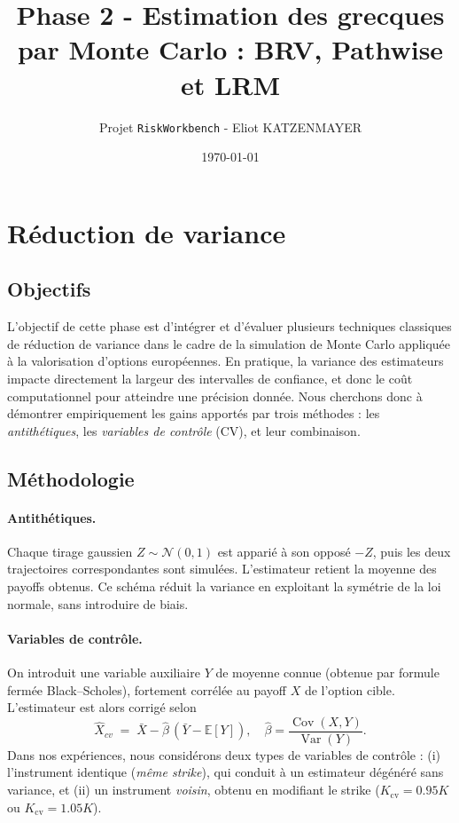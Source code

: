 \documentclass[a4paper,11pt]{article}
\title{Phase 2 - Estimation des grecques par Monte Carlo : BRV, Pathwise et LRM}
\author{Projet \texttt{RiskWorkbench} - Eliot KATZENMAYER}
\date{\today}
\begin{document}
\maketitle

\section{Réduction de variance}

\subsection{Objectifs}
L’objectif de cette phase est d’intégrer et d’évaluer plusieurs techniques classiques
de réduction de variance dans le cadre de la simulation de Monte Carlo appliquée
à la valorisation d’options européennes. En pratique, la variance des estimateurs
impacte directement la largeur des intervalles de confiance, et donc le coût
computationnel pour atteindre une précision donnée. Nous cherchons donc à
démontrer empiriquement les gains apportés par trois méthodes : les
\emph{antithétiques}, les \emph{variables de contrôle} (CV), et leur combinaison.

\subsection{Méthodologie}
\paragraph{Antithétiques.}
Chaque tirage gaussien $Z \sim \mathcal{N}(0,1)$ est apparié à son opposé $-Z$,
puis les deux trajectoires correspondantes sont simulées. L’estimateur retient la
moyenne des payoffs obtenus. Ce schéma réduit la variance en exploitant la
symétrie de la loi normale, sans introduire de biais.

\paragraph{Variables de contrôle.}
On introduit une variable auxiliaire $Y$ de moyenne connue (obtenue par formule
fermée Black--Scholes), fortement corrélée au payoff $X$ de l’option cible.
L’estimateur est alors corrigé selon
\[
\hat{X}_{cv} \;=\; \bar{X} - \hat{\beta} \, (\bar{Y} - \mathbb{E}[Y]),
\quad
\hat{\beta} = \frac{\operatorname{Cov}(X,Y)}{\operatorname{Var}(Y)}.
\]
Dans nos expériences, nous considérons deux types de variables de contrôle :
(i) l’instrument identique (\emph{même strike}), qui conduit à un estimateur
dégénéré sans variance, et (ii) un instrument \emph{voisin}, obtenu en modifiant
le strike ($K_{\text{cv}}=0.95K$ ou $K_{\text{cv}}=1.05K$).
\end{document}
